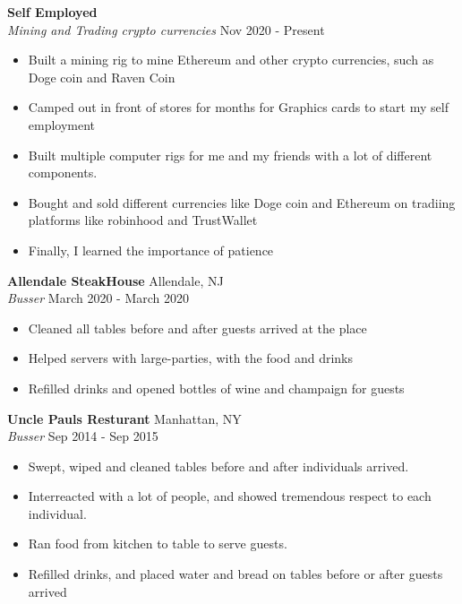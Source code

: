 \documentclass[a4paper]{article}
\begin{document}
\textbf{Self Employed}\\
\textit{Mining and Trading crypto currencies} \hfill Nov 2020 - Present\\
\vspace{-1mm}
\begin{itemize} \itemsep 1pt
	\item Built a mining rig to mine Ethereum and other crypto currencies, such as Doge coin and Raven Coin
	\item Camped out in front of stores for months for Graphics cards to start my self employment
	\item Built multiple computer rigs for me and my friends with a lot of different components.
	\item Bought and sold different currencies like Doge coin and Ethereum on tradiing platforms like robinhood and TrustWallet
	\item Finally, I learned the importance of patience
\end{itemize}
\textbf{Allendale SteakHouse} \hfill Allendale, NJ\\
\textit{Busser} \hfill March 2020 - March 2020\\
\vspace{-1mm}
\begin{itemize} \itemsep 1pt
	\item Cleaned all tables before and after guests arrived at the place
	\item Helped servers with large-parties, with the food and drinks
	\item Refilled drinks and opened bottles of wine and champaign for guests
\end{itemize}
\textbf{Uncle Paul\textquotesingle{}s Resturant} \hfill Manhattan, NY\\
\textit{Busser} \hfill Sep 2014 - Sep 2015\\
\vspace{-1mm}
\begin{itemize} \itemsep 1pt
	\item Swept, wiped and cleaned tables before and after individuals arrived.
	\item Interreacted with a lot of people, and showed tremendous respect to each individual.
	\item Ran food from kitchen to table to serve guests.
	\item Refilled drinks, and placed water and bread on tables before or after guests arrived
\end{itemize}
\end{document}
